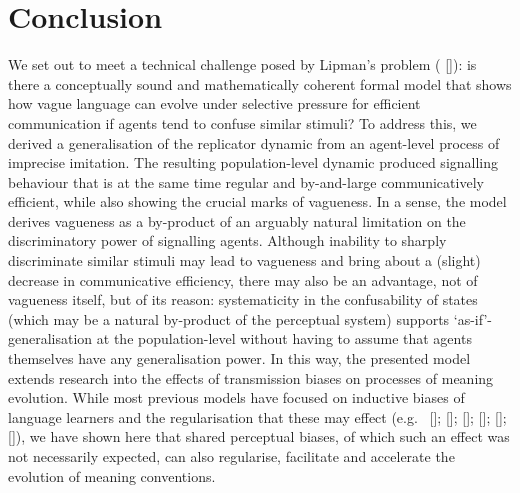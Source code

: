 \documentclass[12pt,english]{article}
\numberwithin{equation}{section}
\newcommand{\citealtbjps}[1]{\citeauthor{#1} [\citeyear{#1}]}
\newcommand{\citepbjps}[1]{(\citeauthor{#1} [\citeyear{#1}])}
\begin{document}

\section{Conclusion}
\label{sec:conclusion}

We set out to meet a technical challenge posed by Lipman's problem
\citepbjps{Lipman2009:Why-is-Language}: is there a conceptually sound and mathematically coherent
formal model that shows how vague language can evolve under selective pressure for efficient
communication if agents tend to confuse similar stimuli? To address this, we derived a
generalisation of the replicator dynamic from an agent-level process of imprecise
imitation. The resulting population-level dynamic produced signalling behaviour that is at the
same time regular and by-and-large communicatively efficient, while also showing the crucial
marks of vagueness. In a sense, the model derives vagueness as a by-product of an arguably
natural limitation on the discriminatory power of signalling agents.  Although inability to
sharply discriminate similar stimuli may lead to vagueness and bring about a (slight) decrease
in communicative efficiency, there may also be an advantage, not of vagueness itself, but of
its reason: systematicity in the confusability of states (which may be a natural by-product of
the perceptual system) supports `as-if'-generalisation at the population-level without
having to assume that agents themselves have any generalisation power. In this way, the
presented model extends research into the effects of transmission biases on processes of
meaning evolution. While most previous models have focused on inductive biases of language
learners and the regularisation that these may effect
(e.g.~\citealtbjps{NowakPlotkin2000:The-Evolution-o}; \citealtbjps{NowakKomarova2001:Evolution-of-Un}; \citealtbjps{KirbyHurford2002:The-Emergence-o}; \citealtbjps{SmithKirby2003:Iterated-Learni}; \citealtbjps{GriffithsKalish2007:Language-Evolut}; \citealtbjps{KirbyGriffith2014:Iterated-Learni}),
we have shown here that shared perceptual biases, of which such an effect was not necessarily
expected, can also regularise, facilitate and accelerate the evolution of meaning conventions.


\end{document}
